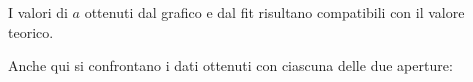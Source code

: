 \documentclass[../main.tex]{subfiles}
\begin{document}
I valori di $a$ ottenuti dal grafico e dal fit risultano compatibili con il valore teorico.

Anche qui si confrontano i dati ottenuti con ciascuna delle due aperture:

\end{document}
